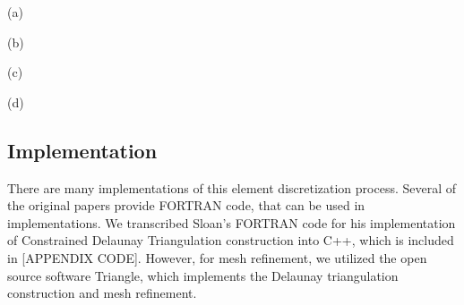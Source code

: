 \documentclass[../fem.tex]{subfiles}
\begin{document}
\begin{Figure}
   \begin{center}
     \begin{minipage}{0.4\textwidth}
       \begin{center}
         
         (a)
       \end{center}
     \end{minipage}
     \begin{minipage}{0.4\textwidth}
       \begin{center}
         
         (b)
       \end{center}
     \end{minipage}

   \ifdraft
   \else
     \begin{minipage}{0.4\textwidth}
       \begin{center}
         
           (c)
       \end{center}
     \end{minipage}
     \begin{minipage}{0.4\textwidth}
       \begin{center}
         
           (d)
       \end{center}
     \end{minipage}
   \fi
   \end{center}
\end{Figure}


\subsection{Implementation}%
\label{sub:implementation}

There are many implementations of this element discretization process. Several
of the original papers provide FORTRAN code, that can be used in
implementations. We transcribed Sloan's FORTRAN code for his implementation of
Constrained Delaunay Triangulation construction into C++, which is included in
[APPENDIX CODE]. However, for mesh refinement, we utilized the open source
software Triangle\cite{T_SOF}, which implements the Delaunay triangulation
construction and mesh refinement.

\end{document}

